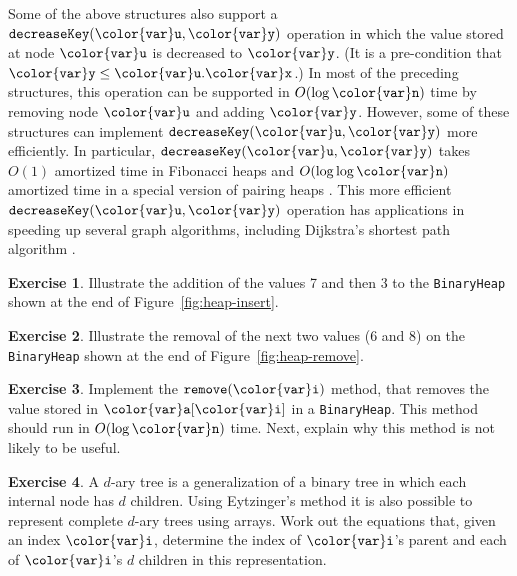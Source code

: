 \documentclass[10pt]{book}
\newcommand{\figref}[1]{Figure~\ref{fig:#1}}
\theoremstyle{plain}
\theoremstyle{definition}
\newtheorem{exc}{Exercise}[chapter]
\newcommand{\exclabel}[1]{\label{exc:#1}}
\begin{document}
Some of the above structures also support a \ensuremath{\mathtt{decreaseKey({\color{var}u},{\color{var}y})}} operation
%
in which the value stored at node \ensuremath{\mathtt{{\color{var}u}}} is decreased to \ensuremath{\mathtt{{\color{var}y}}}.  (It is a
pre-condition that $\ensuremath{\mathtt{{\color{var}y}}}\le\ensuremath{\mathtt{{\color{var}u}.{\color{var}x}}}$.)  In most of the preceding structures,
this operation can be supported in $O(\log \ensuremath{\mathtt{{\color{var}n}}})$ time by removing node
\ensuremath{\mathtt{{\color{var}u}}} and adding  \ensuremath{\mathtt{{\color{var}y}}}.  However, some of these structures can implement
\ensuremath{\mathtt{decreaseKey({\color{var}u},{\color{var}y})}} more efficiently.  In particular, \ensuremath{\mathtt{decreaseKey({\color{var}u},{\color{var}y})}}
takes $O(1)$ amortized time in Fibonacci heaps and $O(\log\log \ensuremath{\mathtt{{\color{var}n}}})$
amortized time in a special version of pairing heaps \cite{e09}.
This more efficient \ensuremath{\mathtt{decreaseKey({\color{var}u},{\color{var}y})}} operation has applications in
speeding up several graph algorithms, including Dijkstra's shortest path
algorithm \cite{ft87}.

\begin{exc}
  Illustrate the addition of the values 7 and then 3 to the \texttt{BinaryHeap}
  shown at the end of \figref{heap-insert}.
\end{exc}

\begin{exc}
  Illustrate the removal of the next two values (6 and 8) on the
  \texttt{BinaryHeap} shown at the end of \figref{heap-remove}.
\end{exc}

\begin{exc}
  Implement the \ensuremath{\mathtt{remove({\color{var}i})}} method, that removes the value stored in
  \ensuremath{\mathtt{{\color{var}a}[{\color{var}i}]}} in a \texttt{BinaryHeap}.  This method should run in $O(\log \ensuremath{\mathtt{{\color{var}n}}})$ time.
  Next, explain why this method is not likely to be useful.
\end{exc}

\begin{exc}\exclabel{general-eytzinger}
  A $d$-ary tree is a generalization of a binary tree in which each
  internal node has $d$ children.  Using Eytzinger's method it is also
  possible to represent complete $d$-ary trees using arrays.  Work out
  the equations that, given an index \ensuremath{\mathtt{{\color{var}i}}}, determine the index of \ensuremath{\mathtt{{\color{var}i}}}'s
  parent and each of \ensuremath{\mathtt{{\color{var}i}}}'s $d$ children in this representation.
\end{exc}
\end{document}
